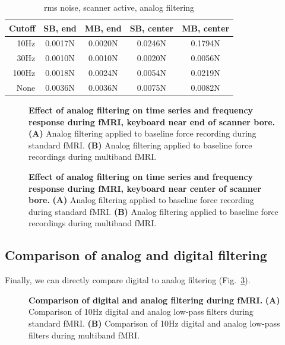 \documentclass[letterpaper, 10 pt, conference]{ieeeconf}  %
\begin{document}
\begin{table}[h]
\caption{rms noise, scanner active, analog filtering}
\label{table:scanner-running-analog}
\begin{center}
\begin{tabular}{|r||c|c||c|c|}
\hline
\textbf{Cutoff} & \textbf{SB, end} & \textbf{MB, end} & \textbf{SB, center} & \textbf{MB, center}\\
\hline
10Hz & 0.0017N & 0.0020N & 0.0246N & 0.1794N\\
\hline
30Hz & 0.0010N & 0.0010N & 0.0020N & 0.0056N\\
\hline
100Hz & 0.0018N & 0.0024N & 0.0054N & 0.0219N\\
\hline
None & 0.0036N & 0.0036N & 0.0075N & 0.0082N\\
\hline
\end{tabular}
\end{center}
\end{table}

\begin{figure}[thpb]
  \centering
  \framebox{\parbox{3.25in}{
  }}
  \caption{\textbf{Effect of analog filtering on time series and frequency response during fMRI, keyboard near end of scanner bore.} \textbf{(A)} Analog filtering applied to baseline force recording during standard fMRI. \textbf{(B)} Analog filtering applied to baseline force recordings during multiband fMRI.}
  \label{fig:scanner-running-analog}
\end{figure}

\begin{figure}[thpb]
  \centering
  \framebox{\parbox{3.25in}{
  }}
  \caption{\textbf{Effect of analog filtering on time series and frequency response during fMRI, keyboard near center of scanner bore.} \textbf{(A)} Analog filtering applied to baseline force recording during standard fMRI. \textbf{(B)} Analog filtering applied to baseline force recordings during multiband fMRI.}
  \label{fig:scanner-running-analog-close}
\end{figure}

\subsection{Comparison of analog and digital filtering}

Finally, we can directly compare digital to analog filtering (Fig.\ \ref{fig:compare-digital-analog}).

\begin{figure}[thpb]
  \centering
  \framebox{\parbox{3.25in}{
  }}
  \caption{\textbf{Comparison of digital and analog filtering during fMRI.} \textbf{(A)} Comparison of 10Hz digital and analog low-pass filters during standard fMRI. \textbf{(B)} Comparison of 10Hz digital and analog low-pass filters during multiband fMRI.}
  \label{fig:compare-digital-analog}
\end{figure}
\end{document}

